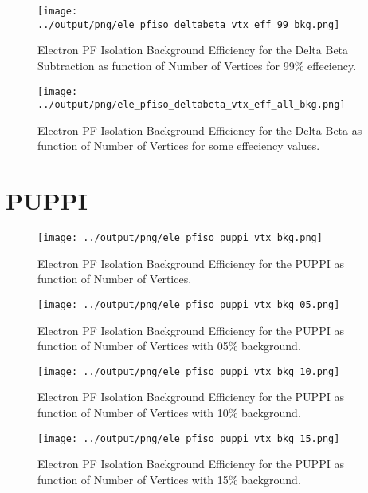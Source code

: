 \documentclass[11pt]{book}
\begin{document}
\begin{figure}[htb]
\centering
\texttt{[image: ../output/png/ele\_pfiso\_deltabeta\_vtx\_eff\_99\_bkg.png]}
\caption{Electron PF Isolation Background Efficiency for the Delta Beta Subtraction as function of Number of Vertices for 99\% effeciency.}
\label{fig:ele_pfiso_vtx_eff_deltabeta_eff_99_bkg}
\end{figure}

\begin{figure}[htb]
\centering
\texttt{[image: ../output/png/ele\_pfiso\_deltabeta\_vtx\_eff\_all\_bkg.png]}
\caption{Electron PF Isolation Background Efficiency for the Delta Beta as function of Number of Vertices for some effeciency values.}
\label{fig:ele_pfiso_vtx_eff_deltabeta_eff_all_bkg}
\end{figure}
\clearpage

\section{PUPPI}
\begin{figure}[htb]
\centering
\texttt{[image: ../output/png/ele\_pfiso\_puppi\_vtx\_bkg.png]}
\caption{Electron PF Isolation Background Efficiency for the PUPPI as function of Number of Vertices.}
\label{fig:ele_pfiso_vtx_bgk_puppi}
\end{figure}

\begin{figure}[htb]
\centering
\texttt{[image: ../output/png/ele\_pfiso\_puppi\_vtx\_bkg\_05.png]}
\caption{Electron PF Isolation Background Efficiency for the PUPPI as function of Number of Vertices with 05\% background.}
\label{fig:ele_pfiso_vtx_bkg_puppi_bkg_05}
\end{figure}

\begin{figure}[htb]
\centering
\texttt{[image: ../output/png/ele\_pfiso\_puppi\_vtx\_bkg\_10.png]}
\caption{Electron PF Isolation Background Efficiency for the PUPPI as function of Number of Vertices with 10\% background.}
\label{fig:ele_pfiso_vtx_bkg_puppi_bkg_10}
\end{figure}

\begin{figure}[htb]
\centering
\texttt{[image: ../output/png/ele\_pfiso\_puppi\_vtx\_bkg\_15.png]}
\caption{Electron PF Isolation Background Efficiency for the PUPPI as function of Number of Vertices with 15\% background.}
\label{fig:ele_pfiso_vtx_bkg_puppi_bkg_15}
\end{figure}
\end{document}
